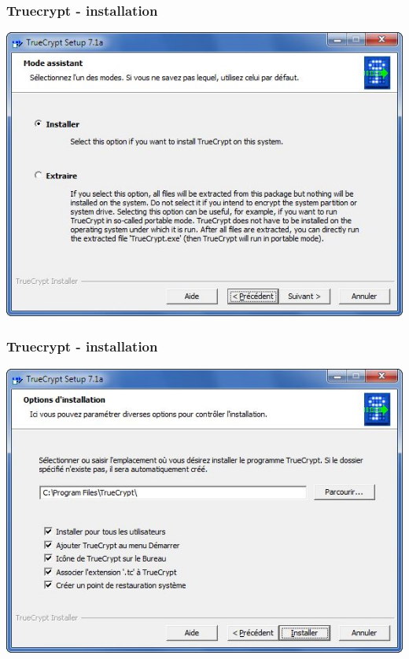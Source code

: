 \documentclass{beamer}
\begin{document}
\begin{frame}
\frametitle{Truecrypt - installation}
\begin{center}
\includegraphics[scale=0.5] {./images/Truecrypt_install03.jpg}
\end{center}
\end{frame}
\begin{frame}
\frametitle{Truecrypt - installation}
\begin{center}
\includegraphics[scale=0.5] {./images/Truecrypt_install04.jpg}
\end{center}
\end{frame}
\end{document}
